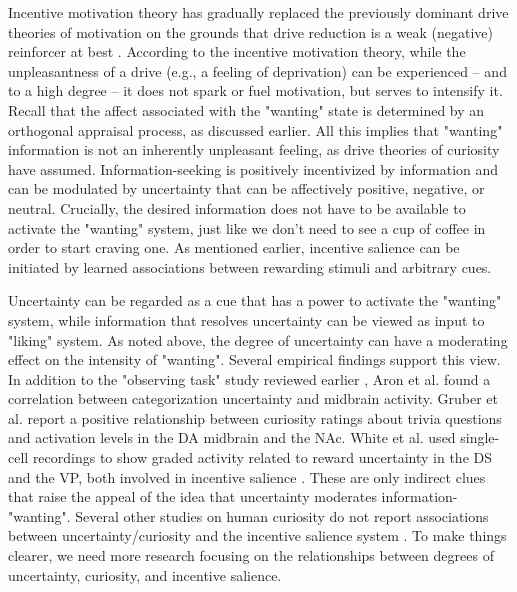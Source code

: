 Incentive motivation theory has gradually replaced the previously dominant drive theories of motivation on the grounds that drive reduction is a weak (negative) reinforcer at best  \parencite{berridge_evolving_2018}. According to the incentive motivation theory, while the unpleasantness of a drive (e.g., a feeling of deprivation) can be experienced -- and to a high degree -- it does not spark or fuel motivation, but serves to intensify it. Recall that the affect associated with the "wanting" state is determined by an orthogonal appraisal process, as discussed earlier. All this implies that "wanting" information is not an inherently unpleasant feeling, as drive theories of curiosity \parencite{berlyne_theory_1954,loewenstein_psychology_1994} have assumed. Information-seeking is positively incentivized by information and can be modulated by uncertainty that can be affectively positive, negative, or neutral. Crucially, the desired information does not have to be available to activate the "wanting" system, just like we don't need to see a cup of coffee in order to start craving one. As mentioned earlier, incentive salience can be initiated by learned associations between rewarding stimuli and arbitrary cues.

Uncertainty can be regarded as a cue that has a power to activate the "wanting" system, while information that resolves uncertainty can be viewed as input to "liking" system. As noted above, the degree of uncertainty can have a moderating effect on the intensity of "wanting". Several empirical findings support this view. In addition to the "observing task" study reviewed earlier \parencite{bromberg-martin_midbrain_2009}, Aron et al. \parencite{aron_human_2004} found a correlation between categorization uncertainty and midbrain activity. Gruber et al. \parencite{gruber_states_2014} report a positive relationship between curiosity ratings about trivia questions and activation levels in the \ac{DA} midbrain and the \ac{NAc}. White et al. \parencite{white_neural_2019} used single-cell recordings to show graded activity related to reward uncertainty in the \ac{DS} and the \ac{VP}, both involved in incentive salience \parencite{smith_ventral_2009,volkow_nonhedonic_2002}. These are only indirect clues that raise the appeal of the idea that uncertainty moderates information-"wanting". Several other studies on human curiosity do not report associations between uncertainty/curiosity and the incentive salience system \parencite{kang_wick_2009,jepma_neural_2012,van_lieshout_induction_2018}. To make things clearer, we need more research focusing on the relationships between degrees of uncertainty, curiosity, and incentive salience.

